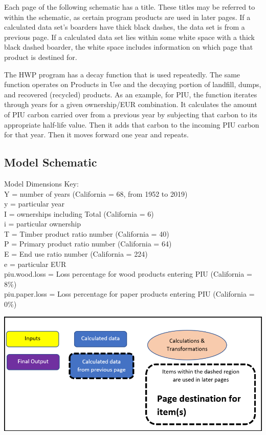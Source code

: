\documentclass[
  openany]{book}
\begin{document}
Each page of the following schematic has a title. These titles may be
referred to within the schematic, as certain program products are used
in later pages. If a calculated data set's boarders have thick black
dashes, the data set is from a previous page. If a calculated data set
lies within some white space with a thick black dashed boarder, the
white space includes information on which page that product is destined
for.

The HWP program has a decay function that is used repeatedly. The same
function operates on Products in Use and the decaying portion of
landfill, dumps, and recovered (recycled) products. As an example, for
PIU, the function iterates through years for a given ownership/EUR
combination. It calculates the amount of PIU carbon carried over from a
previous year by subjecting that carbon to its appropriate half-life
value. Then it adds that carbon to the incoming PIU carbon for that
year. Then it moves forward one year and repeats.

\newpage

\hypertarget{model-func-schem}{%
\subsection{Model Schematic}\label{model-func-schem}}

Model Dimensions Key:\\
Y = number of years (California = 68, from 1952 to 2019)\\
y = particular year\\
I = ownerships including Total (California = 6)\\
i = particular ownership\\
T = Timber product ratio number (California = 40)\\
P = Primary product ratio number (California = 64)\\
E = End use ratio number (California = 224)\\
e = particular EUR\\
piu.wood.loss = Loss percentage for wood products entering PIU
(California = 8\%)\\
piu.paper.loss = Loss percentage for paper products entering PIU
(California = 0\%)

\includegraphics[width=1\linewidth]{images/schematic-0}
\end{document}
